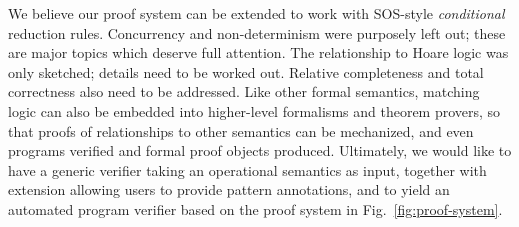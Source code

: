 \documentclass{llncs}
\begin{document}
We believe our proof system can be extended to work with SOS-style {\em
conditional} reduction rules.  Concurrency and non-determinism were purposely
left out; these are major topics which deserve full attention.  The relationship
to Hoare logic was only sketched; details need to be worked out.  Relative
completeness and total correctness also need to be addressed.  Like other formal
semantics, matching logic can also be embedded into higher-level formalisms and
theorem provers, so that proofs of relationships to other semantics can be
mechanized, and even programs verified and formal proof objects produced.
Ultimately, we would like to have a generic verifier taking an operational
semantics as input, together with extension allowing users to provide pattern
annotations, and to yield an automated program verifier based on the proof
system in Fig.~\ref{fig:proof-system}.







\end{document}
